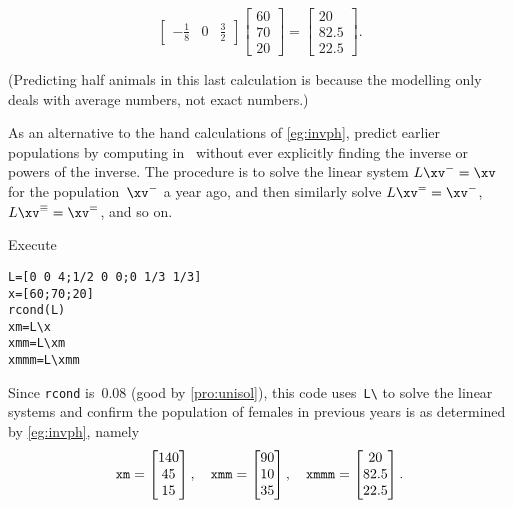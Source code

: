 \begin{example}
\begin{solution}
\begin{itemize}
\begin{equation*}
\begin{bmatrix}
-\frac18&0&\frac32 \end{bmatrix}
\begin{bmatrix} 60\\70\\20 \end{bmatrix}
=\begin{bmatrix} 20\\82.5\\22.5 \end{bmatrix}.
\end{equation*}
\end{itemize}
(Predicting half animals in this last calculation is because the modelling only deals with average numbers, not exact numbers.)
\end{solution}
\end{example}

\begin{example} \label{eg:}
As an alternative to the hand calculations of \autoref{eg:invph}, predict earlier populations by computing in \script\ without ever explicitly finding the inverse or powers of the inverse.
The procedure is to solve the linear system \(L\xv^-=\xv\) for the population~\(\xv^-\) a year ago, and then similarly solve \(L\xv^==\xv^-\), \(L\xv^\equiv=\xv^=\), and so on.
\begin{solution} 
Execute
\setbox\ajrqrbox\hbox{}%
\marginpar{\usebox{\ajrqrbox}}%
\begin{verbatim}
L=[0 0 4;1/2 0 0;0 1/3 1/3]
x=[60;70;20]
rcond(L)
xm=L\x
xmm=L\xm
xmmm=L\xmm
\end{verbatim}
Since \verb|rcond| is~\(0.08\) (good by \autoref{pro:unisol}), this code uses~\verb|L\| to solve the linear systems and confirm the population of females in previous years is as determined by \autoref{eg:invph}, namely
\begin{equation*}
\verb|xm|=\begin{bmatrix} 140 \\ 45 \\ 15 \end{bmatrix},\quad
\verb|xmm|=\begin{bmatrix} 90 \\ 10 \\ 35 \end{bmatrix},\quad
\verb|xmmm|=\begin{bmatrix} 20 \\ 82.5 \\ 22.5 \end{bmatrix}.
\end{equation*} 
\end{solution}
\end{example}













